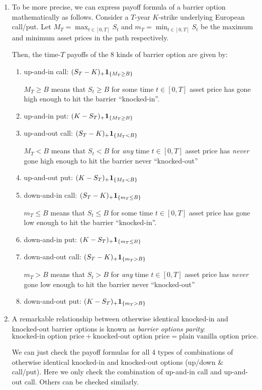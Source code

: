 \begin{enumerate}
\item \label{it:barrier-option-payoff-fmlas} To be more precise, we can express payoff formula of a barrier option
mathematically as follows. Consider a \(T\)-year \(K\)-strike underlying
European call/put. Let \(\displaystyle M_T=\max_{t\in[0,T]}S_t\) and
\(\displaystyle m_T=\min_{t\in[0,T]}S_t\) be the maximum and minimum asset
prices in the path respectively.

Then, the time-\(T\) payoffs of the 8 kinds of barrier option are given by:
\begin{enumerate}[label={(\arabic*)}]
\item up-and-in call: \((S_T-K)_{+}\mathbf{1}_{\left\{M_T\ge B\right\}}\) \begin{note}
\(M_T\ge B\) means that \(S_t\ge B\) for some time \(t\in[0,T]\)
 asset price has gone high enough to hit the barrier
 ``knocked-in''.
\end{note}
\item up-and-in put: \((K-S_T)_{+}\mathbf{1}_{\left\{M_T\ge B\right\}}\)
\item up-and-out call: \((S_T-K)_{+}\mathbf{1}_{\left\{M_T<B\right\}}\) \begin{note}
\(M_T<B\) means that \(S_t<B\) for \emph{any} time \(t\in [0,T]\)
 asset price has \emph{never} gone high enough to hit the
barrier
 never ``knocked-out''
\end{note}
\item up-and-out put: \((K-S_T)_{+}\mathbf{1}_{\left\{M_T<B\right\}}\)
\item down-and-in call: \((S_T-K)_{+}\mathbf{1}_{\left\{m_T\le B\right\}}\) \begin{note}
\(m_T\le B\) means that \(S_t\le B\) for some time \(t\in[0,T]\)
 asset price has gone low enough to hit the barrier
 ``knocked-in''.
\end{note}
\item down-and-in put: \((K-S_T)_{+}\mathbf{1}_{\left\{m_T\le B\right\}}\)
\item down-and-out call: \((S_T-K)_{+}\mathbf{1}_{\left\{m_T>B\right\}}\) \begin{note}
\(m_T>B\) means that \(S_t>B\) for \emph{any} time \(t\in [0,T]\)
 asset price has \emph{never} gone low enough to hit the
barrier
 never ``knocked-out''
\end{note}
\item down-and-out put: \((K-S_T)_{+}\mathbf{1}_{\left\{m_T>B\right\}}\)
\end{enumerate}
\item \label{it:barrier-options-parity} A remarkable relationship between
otherwise identical knocked-in and knocked-out barrier options is known as
\emph{barrier options parity}:
\[
\text{knocked-in option price}+\text{knocked-out option price}
=\text{plain vanilla option price}.
\]
\begin{pf}
We can just check the payoff formulas for all 4 types of combinations of
otherwise identical knocked-in and knocked-out options (up/down \& call/put).
Here we only check the combination of up-and-in call and up-and-out call.
Others can be checked similarly.


\end{pf}
\end{enumerate}
